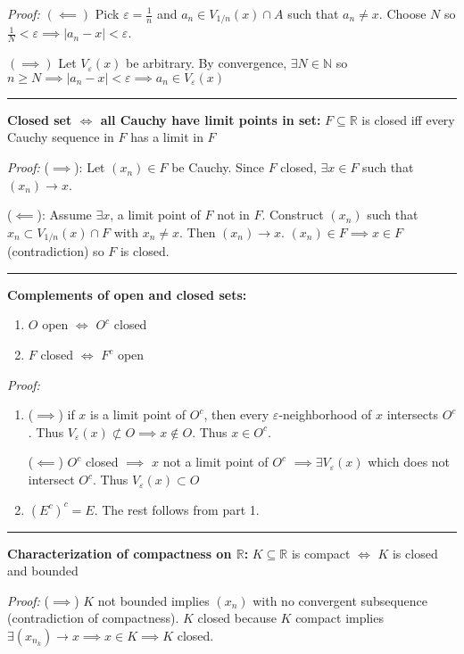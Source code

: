 \documentclass[12pt]{article}
\newcommand{\R}{\mathbb{R}}
\newcommand{\N}{\mathbb{N}}
\newcommand{\abs}[1]{\left\vert #1 \right\vert}
\newcommand{\ep}{\varepsilon}
\renewcommand{\hline}{\vspace*{10pt} \hrule \vspace*{10pt}}
\begin{document}
    \emph{Proof:} $(\impliedby)$ Pick $\ep = \frac{1}{n}$ and $a_n \in V_{1/n}(x) \cap A$ such that $a_n \neq x$. Choose $N$ so $\frac{1}{N} < \ep \implies \abs{a_n - x} < \ep$. 

    $(\implies)$ Let $V_{\ep}(x)$ be arbitrary. By convergence, $\exists N \in \N$ so $n \geq N \implies \abs{a_n - x} < \ep \implies a_n \in V_{\ep}(x)$ 

    \hline 

    \textbf{Closed set $\iff$ all Cauchy have limit points in set:} $F \subseteq \R$ is closed iff every Cauchy sequence in $F$ has a limit in $F$

    \emph{Proof:} ($\implies$): Let $(x_n) \in F$ be Cauchy. Since $F$ closed, $\exists x \in F$ such that $(x_n) \to x$.

    ($\impliedby$): Assume $\exists x$, a limit point of $F$ not in $F$. Construct $(x_n)$ such that $x_n \subset V_{1/n}(x) \cap F$ with $x_n \neq x$. Then $(x_n) \to x$. $(x_n) \in F \implies x \in F$ (contradiction) so $F$ is closed. 

    \hline

    \textbf{Complements of open and closed sets:} 
    \begin{enumerate}
        \item $O$ open $\iff$ $O^c$ closed 
        \item $F$ closed $\iff$ $F^c$ open
    \end{enumerate}

    \emph{Proof:} 
    \begin{enumerate}
        \item ($\implies$) if $x$ is a limit point of $O^c$, then every $\ep$-neighborhood of $x$ intersects $O^c$. Thus $V_{\ep}(x) \not\subset O \implies x \not\in O$. Thus $x \in O^c$.
        
        ($\impliedby$) $O^c$ closed $\implies$ $x$ not a limit point of $O^c$ $\implies \exists V_{\ep}(x)$ which does not intersect $O^c$. Thus $V_{\ep}(x) \subset O$ 

        \item $(E^c)^c = E$. The rest follows from part 1. 
    \end{enumerate}

    \hline

    \textbf{Characterization of compactness on $\R$:} $K \subseteq \R$ is compact $\iff$ $K$ is closed and bounded

    \emph{Proof:} ($\implies$) $K$ not bounded implies $(x_n)$ with no convergent subsequence (contradiction of compactness). $K$ closed because $K$ compact implies $\exists (x_{n_k}) \to x \implies x \in K \implies K$ closed. 
    
\end{document}
